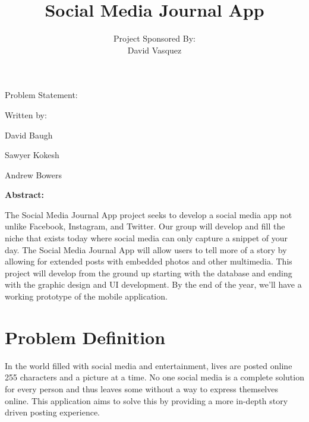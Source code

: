 \documentclass[letterpaper, 10, draftclsnofoot, onecolumn]{IEEEtran}
\title{Social Media Journal App}
\author{ %
	Project Sponsored By: \\
    David Vasquez
}
\begin{document}
\null  %
\nointerlineskip  %
\vfill
\let\snewpage \newpage
\let\newpage \relax
\maketitle
\begin{center}
\huge{Problem Statement:}\par
\vspace{2mm}
\large{Written by:}\par
\normalsize{David Baugh}\par
\normalsize{Sawyer Kokesh}\par
\normalsize{Andrew Bowers}\par
\vspace{8mm}
\large{\textbf{Abstract:}}\par 
\vspace{2mm}
\normalsize{The Social Media Journal App project seeks to develop a social media 
app not unlike Facebook, Instagram, and Twitter. Our group will develop and fill the 
niche that exists today where social media can only capture a snippet of your day. 
The Social Media Journal App will allow users to tell more of a story by allowing for extended posts with embedded photos and other multimedia. 
This project will develop from the ground up starting with the database and ending
 with the graphic design and UI development. By the end of the year, we'll have a working prototype of the mobile application.}
\end{center}
\let \newpage \snewpage
\vfill 
\break %

\setlength\parindent{4mm}
\section*{Problem Definition}\par
\hspace{4ex}In the world filled with social media and entertainment, lives are 
posted online 255 characters and a picture at a time. No one social media is 
a complete solution for every person and thus leaves some without a way to 
express themselves online. This application aims to solve this by providing 
a more in-depth story driven posting experience.
\end{document}
